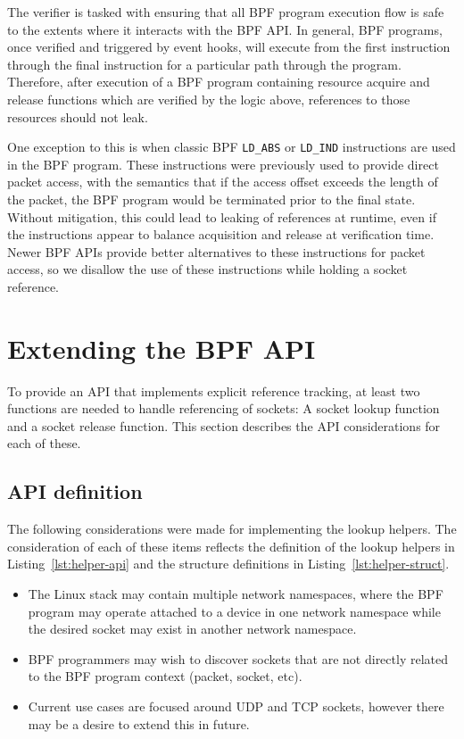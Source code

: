 \documentclass[10pt,sigconf,authorversion]{lpc}
\begin{document}
The verifier is tasked with ensuring that all BPF program execution flow is
safe to the extents where it interacts with the BPF API. In general, BPF
programs, once verified and triggered by event hooks, will execute from the
first instruction through the final instruction for a particular path through
the program. Therefore, after execution of a BPF program containing resource
acquire and release functions which are verified by the logic above, references
to those resources should not leak.

One exception to this is when classic BPF \verb+LD_ABS+ or \verb+LD_IND+
instructions are used in the BPF program. These instructions were previously
used to provide direct packet access, with the semantics that if the access
offset exceeds the length of the packet, the BPF program would be terminated
prior to the final state. Without mitigation, this could lead to leaking of
references at runtime, even if the instructions appear to balance acquisition
and release at verification time. Newer BPF APIs provide better alternatives to
these instructions for packet access, so we disallow the use of these
instructions while holding a socket reference.

\section{Extending the BPF API}

To provide an API that implements explicit reference tracking, at least two
functions are needed to handle referencing of sockets: A socket lookup function
and a socket release function. This section describes the API considerations
for each of these.

\subsection{API definition}

The following considerations were made for implementing the lookup helpers. The
consideration of each of these items reflects the definition of the lookup
helpers in Listing~\ref{lst:helper-api} and the structure definitions in
Listing~\ref{lst:helper-struct}.

\begin{itemize}
    \item The Linux stack may contain multiple network namespaces, where the
          BPF program may operate attached to a device in one network namespace
          while the desired socket may exist in another network namespace.
    \item BPF programmers may wish to discover sockets that are not directly
          related to the BPF program context (packet, socket, etc).
    \item Current use cases are focused around UDP and TCP sockets, however
          there may be a desire to extend this in future.
\end{itemize}
\end{document}
